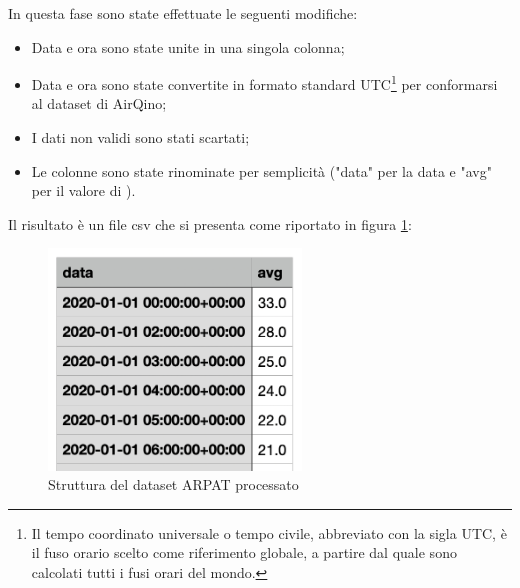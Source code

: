 In questa fase sono state effettuate le seguenti modifiche:
\begin{itemize}
  \item Data e ora sono state unite in una singola colonna;
  \item Data e ora sono state convertite in formato standard UTC\footnote{Il tempo coordinato universale o tempo civile, abbreviato con la sigla UTC, è il fuso orario scelto come riferimento globale, a partire dal quale sono calcolati tutti i fusi orari del mondo.} per conformarsi al dataset di AirQino;
  \item I dati non validi sono stati scartati;
  \item Le colonne sono state rinominate per semplicità ("data" per la data e "avg" per il valore di ).
\end{itemize}

Il risultato è un file csv che si presenta come riportato in figura \ref{fig:ds-arpat-dopo}:

\begin{figure}[H]
\centering
\captionsetup{justification=centering}
\includegraphics[width=0.60\textwidth,height=\textheight,keepaspectratio]{img/dataset_arpat_no2_dopo.png}
\caption{Struttura del dataset ARPAT  processato}
\label{fig:ds-arpat-dopo}
\end{figure}

